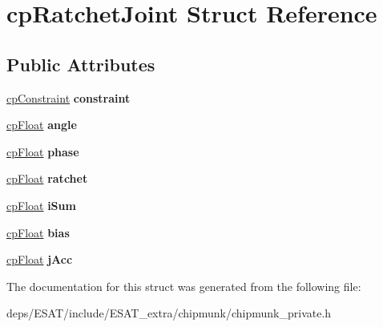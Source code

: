 \hypertarget{structcp_ratchet_joint}{}\section{cp\+Ratchet\+Joint Struct Reference}
\label{structcp_ratchet_joint}
\subsection*{Public Attributes}
\begin{DoxyCompactItemize}
\item 
\mbox{\label{structcp_ratchet_joint_af9d8bbe16647cdd22ac11cc62c159ec6}} 
\mbox{\hyperlink{structcp_constraint}{cp\+Constraint}} {\bfseries constraint}
\item 
\mbox{\label{structcp_ratchet_joint_ad59adcecd4f37a4f852e061fab6f6f73}} 
\mbox{\hyperlink{group__basic_types_gac1ed65573e035bf892505768c852d8d3}{cp\+Float}} {\bfseries angle}
\item 
\mbox{\label{structcp_ratchet_joint_a331d7a3810f61fdb2c8460157c8f4ff1}} 
\mbox{\hyperlink{group__basic_types_gac1ed65573e035bf892505768c852d8d3}{cp\+Float}} {\bfseries phase}
\item 
\mbox{\label{structcp_ratchet_joint_a0eec70ed3e1e8ef260e8a008ab3fb5a6}} 
\mbox{\hyperlink{group__basic_types_gac1ed65573e035bf892505768c852d8d3}{cp\+Float}} {\bfseries ratchet}
\item 
\mbox{\label{structcp_ratchet_joint_a11e3d08ea918cc5a9b7434d79b83e329}} 
\mbox{\hyperlink{group__basic_types_gac1ed65573e035bf892505768c852d8d3}{cp\+Float}} {\bfseries i\+Sum}
\item 
\mbox{\label{structcp_ratchet_joint_a5560e06a4fa4e0ad50a9be0df9bf03d6}} 
\mbox{\hyperlink{group__basic_types_gac1ed65573e035bf892505768c852d8d3}{cp\+Float}} {\bfseries bias}
\item 
\mbox{\label{structcp_ratchet_joint_a26d63236a02cf6622ebc256db530b578}} 
\mbox{\hyperlink{group__basic_types_gac1ed65573e035bf892505768c852d8d3}{cp\+Float}} {\bfseries j\+Acc}
\end{DoxyCompactItemize}


The documentation for this struct was generated from the following file\+:\begin{DoxyCompactItemize}
\item 
deps/\+E\+S\+A\+T/include/\+E\+S\+A\+T\+\_\+extra/chipmunk/chipmunk\+\_\+private.\+h\end{DoxyCompactItemize}
